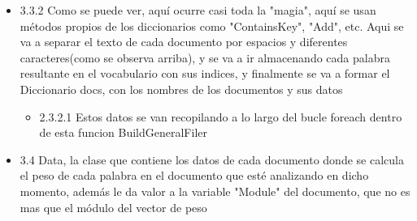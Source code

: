 \documentclass{article}
\begin{document}
\begin{enumerate}
\begin{itemize}
            \begin{figure}
            \end{figure}[h]
            \newpage
            \item 3.3.2 Como se puede ver, aquí ocurre casi toda la "magia", aquí se usan métodos propios de los diccionarios como "ContainsKey", "Add", etc. Aqui se va a separar el texto de cada documento por espacios y diferentes caracteres(como se observa arriba), y se va a ir almacenando cada palabra resultante en el vocabulario con sus indices, y finalmente se va a formar el Diccionario docs, con los nombres de los documentos y sus datos
            \begin{itemize}
                \item 2.3.2.1 Estos datos se van recopilando a lo largo del bucle foreach dentro de esta funcion BuildGeneralFiler
            \end{itemize}

            \item 3.4 Data, la clase que contiene los datos de cada documento donde se calcula el peso de cada palabra en el documento que esté analizando en dicho momento, además le da valor a la variable "Module" del documento, que no es mas que el módulo del vector de peso
            

\end{itemize}
\end{enumerate}
\end{document}
